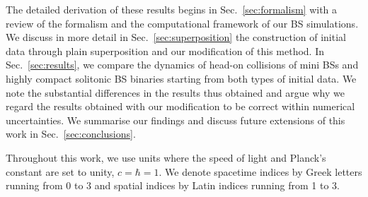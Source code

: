 \documentclass[11pt]{report}  %
\begin{document}
The detailed derivation of these results begins
in Sec.~\ref{sec:formalism} with a review of
the formalism and the computational framework of our
BS simulations. We discuss in more detail
in Sec.~\ref{sec:superposition} the construction of initial
data through plain superposition and our modification of this
method. In Sec.~\ref{sec:results}, we compare the dynamics
of head-on collisions of mini BSs and highly compact solitonic BS
binaries starting from both types of initial data. We note
the substantial differences in the results thus obtained
and argue why we regard the results obtained with our
modification to be correct within numerical uncertainties.
We summarise our findings
and discuss future extensions of this work in
Sec.~\ref{sec:conclusions}.

Throughout this work, we use units where the speed of light and
Planck's constant are set to unity, $c=\hbar=1$. We denote
spacetime indices by Greek letters running from 0 to 3 and
spatial indices by Latin indices running from 1 to 3.
\end{document}
